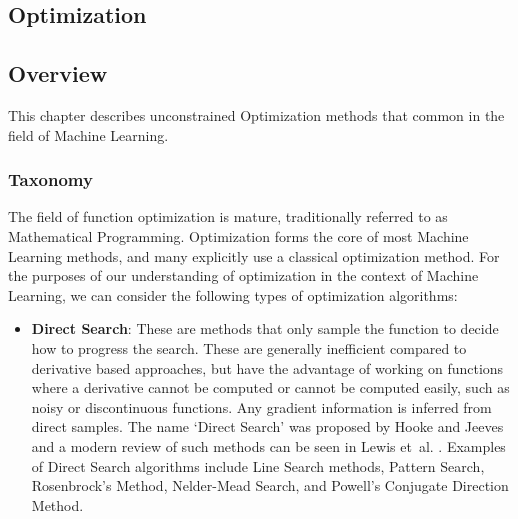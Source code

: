 

\renewcommand{\bibsection}{\subsection{\bibname}}
\begin{bibunit}

\chapter{Optimization}
\label{ch:optimization}

\section{Overview}
This chapter describes unconstrained Optimization methods that common in the field of Machine Learning.

\subsection{Taxonomy}
The field of function optimization is mature, traditionally referred to as Mathematical Programming. Optimization forms the core of most Machine Learning methods, and many explicitly use a classical optimization method. For the purposes of our understanding of optimization in the context of Machine Learning, we can consider the following types of optimization algorithms:

\begin{itemize}
	\item \textbf{Direct Search}: These are methods that only sample the function to decide how to progress the search. These are generally inefficient compared to derivative based approaches, but have the advantage of working on functions where a derivative cannot be computed or cannot be computed easily, such as noisy or discontinuous functions. Any gradient information is inferred from direct samples. The name `Direct Search' was proposed by Hooke and Jeeves \cite{Hooke1961} and a modern review of such methods can be seen in Lewis et~al. \cite{Lewis2000}. Examples of Direct Search algorithms include Line Search methods, Pattern Search, Rosenbrock's Method, Nelder-Mead Search, and Powell's Conjugate Direction Method.


\end{itemize}
\end{bibunit}
